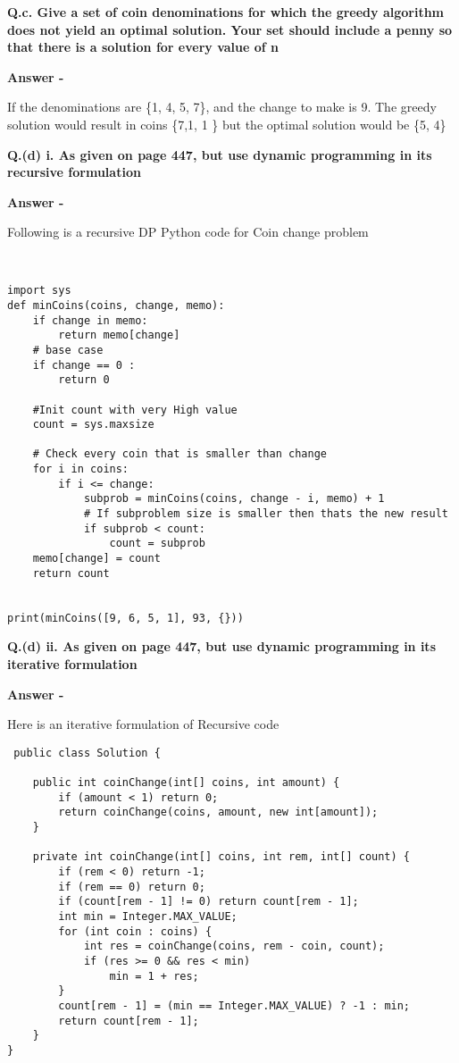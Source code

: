 \documentclass[5pt]{article}
\begin{document}
 \textbf{Q.c. Give a set of coin denominations for which the greedy algorithm does not yield an optimal solution. Your set should include a penny so that there is a solution for every value of n}
 \setlength{\parskip}{1.2em}
\setlength{\parindent}{0em}

\textbf{Answer -}

 If the denominations are \{1, 4, 5, 7\}, and the change to make is 9. The greedy solution would result in coins \{7,1, 1 \} but the optimal solution would be \{5, 4\}

 \textbf{Q.(d) i. As given on page 447, but use dynamic programming in its recursive formulation} 
\setlength{\parskip}{1.2em}
\setlength{\parindent}{0em}

\textbf{Answer -}

Following is a recursive DP Python code for Coin change problem
\begin{lstlisting}


import sys
def minCoins(coins, change, memo):
    if change in memo:
        return memo[change]
    # base case
    if change == 0 :
        return 0

    #Init count with very High value
    count = sys.maxsize

    # Check every coin that is smaller than change
    for i in coins:
        if i <= change:
            subprob = minCoins(coins, change - i, memo) + 1
            # If subproblem size is smaller then thats the new result
            if subprob < count:
                count = subprob
    memo[change] = count
    return count


print(minCoins([9, 6, 5, 1], 93, {}))
\end{lstlisting}
 
  \textbf{Q.(d) ii. As given on page 447, but use dynamic programming in its iterative formulation} 
\setlength{\parskip}{1.2em}
\setlength{\parindent}{0em}

\textbf{Answer -}

Here is an iterative formulation of Recursive code

 \begin{lstlisting}
 public class Solution {

    public int coinChange(int[] coins, int amount) {        
        if (amount < 1) return 0;
        return coinChange(coins, amount, new int[amount]);
    }

    private int coinChange(int[] coins, int rem, int[] count) {
        if (rem < 0) return -1;
        if (rem == 0) return 0;
        if (count[rem - 1] != 0) return count[rem - 1];
        int min = Integer.MAX_VALUE;
        for (int coin : coins) {
            int res = coinChange(coins, rem - coin, count);
            if (res >= 0 && res < min)
                min = 1 + res;
        }
        count[rem - 1] = (min == Integer.MAX_VALUE) ? -1 : min;
        return count[rem - 1];
    }
}
 \end{lstlisting}
\end{document}
